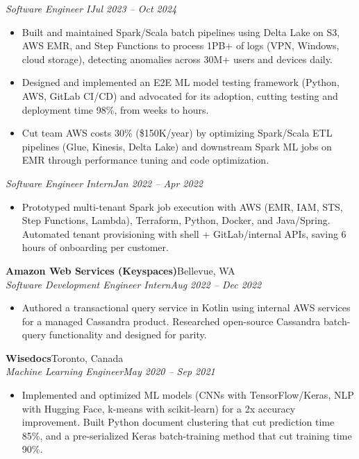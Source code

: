 \documentclass[letterpaper,10pt]{article}
\newcommand{\role}[4]{%
  \noindent\textbf{#1}\hfill #2\\[1pt]%
  \textit{#3}\hfill \textit{#4}\par%
}
\newcommand{\subrole}[2]{%
  \noindent\textit{#1}\hfill \textit{#2}\par%
}
\newenvironment{bullets}{%
  \begin{itemize}[leftmargin=1.5em,topsep=2pt,itemsep=1pt,parsep=0pt]%
}{\end{itemize}}
\begin{document}
\subrole{Software Engineer I}{Jul 2023 -- Oct 2024}
\begin{bullets}
  \item Built and maintained Spark/Scala batch pipelines using Delta Lake on S3, AWS EMR, and Step Functions to process 1PB+ of logs (VPN, Windows, cloud storage), detecting anomalies across 30M+ users and devices daily.
  \item Designed and implemented an E2E ML model testing framework (Python, AWS, GitLab CI/CD) and advocated for its adoption, cutting testing and deployment time 98\%, from weeks to hours.
  \item Cut team AWS costs 30\% (\$150K/year) by optimizing Spark/Scala ETL pipelines (Glue, Kinesis, Delta Lake) and downstream Spark ML jobs on EMR through performance tuning and code optimization.
\end{bullets}

\subrole{Software Engineer Intern}{Jan 2022 -- Apr 2022}
\begin{bullets}
  \item Prototyped multi-tenant Spark job execution with AWS (EMR, IAM, STS, Step Functions, Lambda), Terraform, Python, Docker, and Java/Spring. Automated tenant provisioning with shell + GitLab/internal APIs, saving 6 hours of onboarding per customer.
\end{bullets}

\vspace{3pt}
\role{Amazon Web Services (Keyspaces)}{Bellevue, WA}{Software Development Engineer Intern}{Aug 2022 -- Dec 2022}
\begin{bullets}
  \item Authored a transactional query service in Kotlin using internal AWS services for a managed Cassandra product. Researched open-source Cassandra batch-query functionality and designed for parity.
\end{bullets}

\vspace{3pt}
\role{Wisedocs}{Toronto, Canada}{Machine Learning Engineer}{May 2020 -- Sep 2021}
\begin{bullets}
  \item Implemented and optimized ML models (CNNs with TensorFlow/Keras, NLP with Hugging Face, k-means with scikit-learn) for a 2x accuracy improvement. Built Python document clustering that cut prediction time 85\%, and a pre-serialized Keras batch-training method that cut training time 90\%.
\end{bullets}
\end{document}
